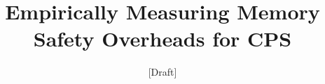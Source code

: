 \documentclass{acm_proc_article-sp}
\newcommand*{\affmark}[1][*]{\textsuperscript{#1}}
\begin{document}
\title{Empirically Measuring Memory Safety Overheads for CPS}
\subtitle{[Draft]}
\begin{comment}
\numberofauthors{4}
\author{
\alignauthor
Mart\'{i}n Ochoa\\
       \affaddr{Singapore University of Technology and Design}\\
       \email{martin\_ochoa@sutd.edu.sg}
\alignauthor
Eyasu Getahun Chekole\\
       \affaddr{Singapore University of Technology and Design}\\
       \affaddr{Advanced Digital Sciences Center, Illinois at Singapore}\\
       \email{eyasu\_chekole@mymail.sutd.edu.sg}\\
\and
\alignauthor
David K. Y. Yau\\
       \affaddr{Singapore University of Technology and Design}\\
       \affaddr{Advanced Digital Sciences Center, Illinois at Singapore}\\
       \email{david\_yau@sutd.edu.sg}
\alignauthor
John Henry Castellanos Alvarado\\
       \affaddr{Singapore University of Technology and Design}\\
       \email{john\_alvarado@mymail.sutd.edu.sg}
}
\end{comment}
\begin{comment}
\author{%
Mart\'{i}n Ochoa\affmark[1], Eyasu Getahun Chekole\affmark[1,2], John Henry Alvarado\affmark[1], David K. Y. Yau\affmark[1,2]\\\\
\affaddr{\affmark[1]Singapore University of Technology and Design}\\
\email{\{martin\_ochoa, david\_yau\}@sutd.edu.sg}\\
\email{\{eyasu\_chekole, john\_alvarado\}@mymail.sutd.edu.sg}\\\\
\affaddr{\affmark[2]Advanced Digital Sciences Center, Illinois at Singapore}\\
\email{\{eyasu.c, david.yau\}@adsc.com.sg}
}
\end{comment}

\begin{comment}
\author[1]{Alice Smith}
\author[2]{Bob Jones}
\affil[1]{Department of Mathematics, University X}
\affil[2]{Department of Biology, University Y}
\end{comment}
\end{document}
